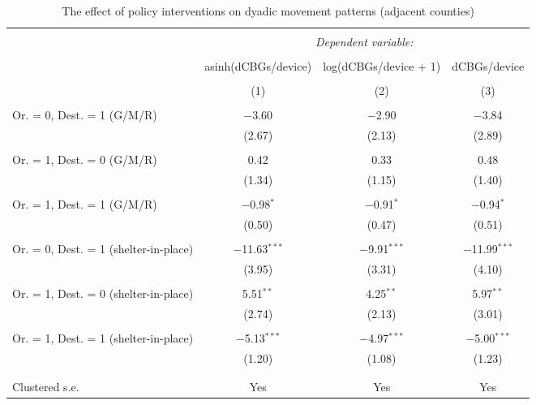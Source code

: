 
\begin{table}[!htbp] \centering 
  \caption{The effect of policy interventions on dyadic movement patterns (adjacent counties)} 
  \label{tab:dyad_model_adjacent} 
\footnotesize 
\begin{tabular}{@{\extracolsep{5pt}}lccc} 
\\[-1.8ex]\hline 
\hline \\[-1.8ex] 
 & \multicolumn{3}{c}{\textit{Dependent variable:}} \\ 
\cline{2-4} 
\\[-1.8ex] & asinh(dCBGs/device) & log(dCBGs/device + 1) & dCBGs/device \\ 
\\[-1.8ex] & (1) & (2) & (3)\\ 
\hline \\[-1.8ex] 
 Or. = 0, Dest. = 1 (G/M/R) & $-$3.60 & $-$2.90 & $-$3.84 \\ 
  & (2.67) & (2.13) & (2.89) \\ 
  & & & \\ 
 Or. = 1, Dest. = 0 (G/M/R) & 0.42 & 0.33 & 0.48 \\ 
  & (1.34) & (1.15) & (1.40) \\ 
  & & & \\ 
 Or. = 1, Dest. = 1 (G/M/R) & $-$0.98$^{*}$ & $-$0.91$^{*}$ & $-$0.94$^{*}$ \\ 
  & (0.50) & (0.47) & (0.51) \\ 
  & & & \\ 
 Or. = 0, Dest. = 1 (shelter-in-place) & $-$11.63$^{***}$ & $-$9.91$^{***}$ & $-$11.99$^{***}$ \\ 
  & (3.95) & (3.31) & (4.10) \\ 
  & & & \\ 
 Or. = 1, Dest. = 0 (shelter-in-place) & 5.51$^{**}$ & 4.25$^{**}$ & 5.97$^{**}$ \\ 
  & (2.74) & (2.13) & (3.01) \\ 
  & & & \\ 
 Or. = 1, Dest. = 1 (shelter-in-place) & $-$5.13$^{***}$ & $-$4.97$^{***}$ & $-$5.00$^{***}$ \\ 
  & (1.20) & (1.08) & (1.23) \\ 
  & & & \\ 
\hline \\[-1.8ex] 
Clustered s.e. & Yes & Yes & Yes \\ 

\end{tabular}
\end{table}
